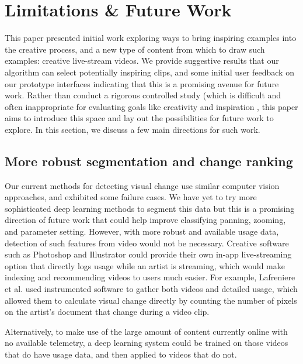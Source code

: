 \section{Limitations \& Future Work}
This paper presented initial work exploring ways to bring inspiring examples into the creative process, and a new type of content from which to draw such examples: creative live-stream videos. We provide suggestive results that our algorithm can select potentially inspiring clips, and some initial user feedback on our prototype interfaces indicating that this is a promising avenue for future work. Rather than conduct a rigorous controlled study (which is difficult and often inappropriate for evaluating goals like creativity and inspiration \cite{Shneiderman2007}, this paper aims to introduce this space and lay out the possibilities for future work to explore. In this section, we discuss a few main directions for such work.

\subsection{More robust segmentation and change ranking}
Our current methods for detecting visual change use similar computer vision approaches, and exhibited some failure cases. We have yet to try more sophisticated deep learning methods to segment this data but this is a promising direction of future work that could help improve classifying panning, zooming, and parameter setting. However, with more robust and available usage data, detection of such features from video would not be necessary. Creative software such as Photoshop and Illustrator could provide their own in-app live-streaming option that directly logs usage while an artist is streaming, which would make indexing and recommending videos to users much easier. For example, Lafreniere et al. \cite{Lafreniere2014} used instrumented software to gather both videos and detailed usage, which allowed them to calculate visual change directly by counting the number of pixels on the artist's document that change during a video clip.

Alternatively, to make use of the large amount of content currently online with no available telemetry, a deep learning system could be trained on those videos that do have usage data, and then applied to videos that do not.


